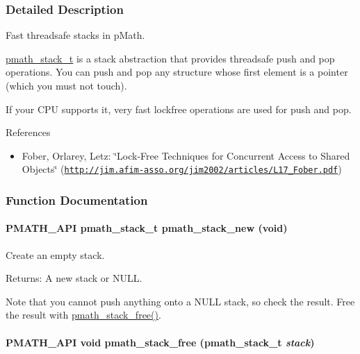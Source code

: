 \subsubsection{Detailed Description}
Fast threadsafe stacks in pMath. 

\hyperlink{classpmath__stack__t}{pmath\_\-stack\_\-t} is a stack abstraction that provides threadsafe push and pop operations. You can push and pop any structure whose first element is a pointer (which you must not touch).

If your CPU supports it, very fast lockfree operations are used for push and pop.

References\begin{itemize}
\item Fober, Orlarey, Letz: \char`\"{}Lock-Free Techniques for Concurrent Access to Shared Objects\char`\"{} (\href{http://jim.afim-asso.org/jim2002/articles/L17_Fober.pdf}{\tt http://jim.afim-asso.org/jim2002/articles/L17\_\-Fober.pdf}) \end{itemize}


\subsubsection{Function Documentation}
\hypertarget{group__stacks_g4a549111f394261de5ac3cc3acda428b}{
\paragraph[{pmath\_\-stack\_\-new}]{\setlength{\rightskip}{0pt plus 5cm}PMATH\_\-API {\bf pmath\_\-stack\_\-t} pmath\_\-stack\_\-new (void)}\hfill}
\label{group__stacks_g4a549111f394261de5ac3cc3acda428b}


Create an empty stack. 

\begin{Desc}
\item[Returns:]A new stack or NULL.\end{Desc}
Note that you cannot push anything onto a NULL stack, so check the result. Free the result with \hyperlink{group__stacks_gc681555957545245455f2a0ac97e3828}{pmath\_\-stack\_\-free()}. \hypertarget{group__stacks_gc681555957545245455f2a0ac97e3828}{
\paragraph[{pmath\_\-stack\_\-free}]{\setlength{\rightskip}{0pt plus 5cm}PMATH\_\-API void pmath\_\-stack\_\-free ({\bf pmath\_\-stack\_\-t} {\em stack})}\hfill}
\label{group__stacks_gc681555957545245455f2a0ac97e3828}


